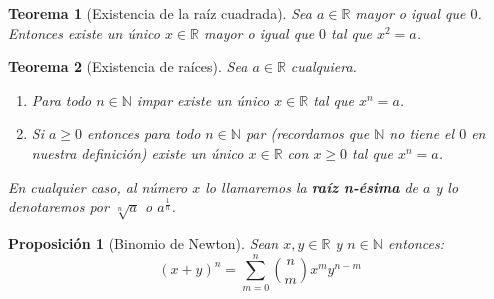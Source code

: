 \documentclass{article}
\newtheorem{theorem}{Teorema}
\newtheorem{prop}{Proposición}
\begin{document}
\begin{theorem}[Existencia de la raíz cuadrada]
Sea $a \in \mathbb{R}$ mayor o igual que $0$. Entonces existe un único $x \in \mathbb{R}$ mayor o igual que $0$ tal que $x^2 = a$.
\end{theorem}

\begin{theorem}[Existencia de raíces]
Sea $a \in \mathbb{R}$ cualquiera.
\begin{enumerate}
\item
Para todo $n \in \mathbb{N}$ impar existe un único $x\in \mathbb{R}$ tal que $x^n = a$.
\item
Si $a\geq 0$ entonces para todo $n \in \mathbb{N}$ par (recordamos que $\mathbb{N}$ no tiene el $0$ en nuestra definición) existe un único $x\in \mathbb{R}$ con $x\geq 0$ tal que $x^n = a$.
\end{enumerate}
En cualquier caso, al número $x$ lo llamaremos la \textbf{raíz n-ésima} de $a$ y lo denotaremos por $\sqrt[n]{a}$ o $a^{\frac{1}{n}}$.
\end{theorem}



\begin{prop}[Binomio de Newton]
Sean $x,y \in \mathbb{R}$ y $n \in \mathbb{N}$ entonces:
\begin{equation}
(x + y)^n = \sum_{m=0}^{n} {n \choose m} x^m y^{n-m}
\end{equation}
\end{prop}
\end{document}
